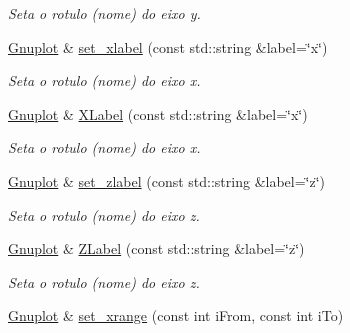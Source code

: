 \begin{DoxyCompactItemize}
\begin{DoxyCompactList}\small\item\em Seta o rotulo (nome) do eixo y. \end{DoxyCompactList}\item 
\hypertarget{classGnuplot_a58808028aec03a22b5c19693b14baeef}{\hyperlink{classGnuplot}{Gnuplot} \& \hyperlink{classGnuplot_a58808028aec03a22b5c19693b14baeef}{set\-\_\-xlabel} (const std\-::string \&label=\char`\"{}x\char`\"{})}\label{classGnuplot_a58808028aec03a22b5c19693b14baeef}

\begin{DoxyCompactList}\small\item\em Seta o rotulo (nome) do eixo x. \end{DoxyCompactList}\item 
\hypertarget{classGnuplot_ac36ea75f0759c98da946389e60c12278}{\hyperlink{classGnuplot}{Gnuplot} \& \hyperlink{classGnuplot_ac36ea75f0759c98da946389e60c12278}{X\-Label} (const std\-::string \&label=\char`\"{}x\char`\"{})}\label{classGnuplot_ac36ea75f0759c98da946389e60c12278}

\begin{DoxyCompactList}\small\item\em Seta o rotulo (nome) do eixo x. \end{DoxyCompactList}\item 
\hypertarget{classGnuplot_ab3206e715d20f05cc0dd1eec89ce8b07}{\hyperlink{classGnuplot}{Gnuplot} \& \hyperlink{classGnuplot_ab3206e715d20f05cc0dd1eec89ce8b07}{set\-\_\-zlabel} (const std\-::string \&label=\char`\"{}z\char`\"{})}\label{classGnuplot_ab3206e715d20f05cc0dd1eec89ce8b07}

\begin{DoxyCompactList}\small\item\em Seta o rotulo (nome) do eixo z. \end{DoxyCompactList}\item 
\hypertarget{classGnuplot_ace776aa2b273c0ec934e856cb28416eb}{\hyperlink{classGnuplot}{Gnuplot} \& \hyperlink{classGnuplot_ace776aa2b273c0ec934e856cb28416eb}{Z\-Label} (const std\-::string \&label=\char`\"{}z\char`\"{})}\label{classGnuplot_ace776aa2b273c0ec934e856cb28416eb}

\begin{DoxyCompactList}\small\item\em Seta o rotulo (nome) do eixo z. \end{DoxyCompactList}\item 
\hypertarget{classGnuplot_a726232ac7226b9fc8811eaefa87c902b}{\hyperlink{classGnuplot}{Gnuplot} \& \hyperlink{classGnuplot_a726232ac7226b9fc8811eaefa87c902b}{set\-\_\-xrange} (const int i\-From, const int i\-To)}\label{classGnuplot_a726232ac7226b9fc8811eaefa87c902b}


\end{DoxyCompactItemize}
